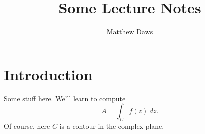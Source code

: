 \documentclass[a4paper,12pt]{article}
\begin{document}
\title{Some Lecture Notes}
\author{Matthew Daws}
\maketitle

\section{Introduction}

Some stuff here.  We'll learn to compute
\[ A = \int_C f(z) \ dz. \]
Of course, here $C$ is a contour in the complex plane.
\end{document}
